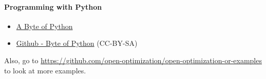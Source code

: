 \paragraph{\textbf{Programming with Python}}
\begin{itemize}
\item\href{https://open.umn.edu/opentextbooks/textbooks/a-byte-of-python}{A Byte of Python}
\item\href{https://github.com/swaroopch/byte-of-python}{Github - Byte of Python} (CC-BY-SA)
\end{itemize}



Also, go to \url{https://github.com/open-optimization/open-optimization-or-examples} to look at more examples.
